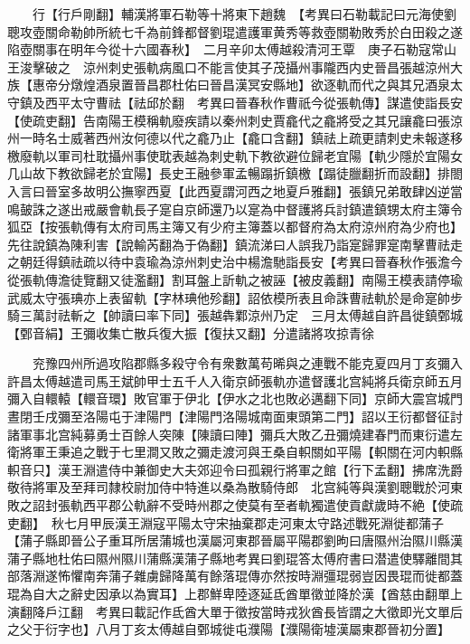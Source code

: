 　　行【行戶剛翻】輔漢將軍石勒等十將東下趙魏　【考異曰石勒載記曰元海使劉聰攻壺關命勒帥所統七千為前鋒都督劉琨遣護軍黄秀等救壺關勒敗秀於白田殺之遂陷壺關事在明年今從十六國春秋】　二月辛卯太傅越殺清河王覃　庚子石勒寇常山王浚擊破之　涼州刺史張軌病風口不能言使其子茂攝州事隴西内史晉昌張越涼州大族【惠帝分燉煌酒泉置晉昌郡杜佑曰晉昌漢冥安縣地】欲逐軌而代之與其兄酒泉太守鎮及西平太守曹祛【祛邱於翻　考異曰晉春秋作曹祇今從張軌傳】謀遣使詣長安【使疏吏翻】告南陽王模稱軌廢疾請以秦州刺史賈龕代之龕將受之其兄讓龕曰張涼州一時名士威著西州汝何德以代之龕乃止【龕口含翻】鎮祛上疏更請刺史未報遂移檄廢軌以軍司杜耽攝州事使耽表越為刺史軌下教欲避位歸老宜陽【軌少隱於宜陽女几山故下教欲歸老於宜陽】長史王融參軍孟暢蹋折鎮檄【蹋徒臘翻折而設翻】排閤入言曰晉室多故明公撫寧西夏【此西夏謂河西之地夏戶雅翻】張鎮兄弟敢肆凶逆當鳴皷誅之遂出戒嚴會軌長子寔自京師還乃以寔為中督護將兵討鎮遣鎮甥太府主簿令狐亞【按張軌傳有太府司馬主簿又有少府主簿蓋以都督府為太府涼州府為少府也】先往說鎮為陳利害【說輸芮翻為于偽翻】鎮流涕曰人誤我乃詣寔歸罪寔南擊曹祛走之朝廷得鎮祛疏以待中袁瑜為涼州刺史治中楊澹馳詣長安【考異曰晉春秋作張澹今從張軌傳澹徒覽翻又徒濫翻】割耳盤上訢軌之被誣【被皮義翻】南陽王模表請停瑜武威太守張琠亦上表留軌【字林琠他殄翻】詔依模所表且命誅曹祛軌於是命寔帥步騎三萬討祛斬之【帥讀曰率下同】張越犇鄴涼州乃定　三月太傅越自許昌徙鎮鄄城【鄄音絹】王彌收集亡散兵復大振【復扶又翻】分遣諸將攻掠青徐

　　兖豫四州所過攻陷郡縣多殺守令有衆數萬苟晞與之連戰不能克夏四月丁亥彌入許昌太傅越遣司馬王斌帥甲士五千人入衛京師張軌亦遣督護北宫純將兵衛京師五月彌入自轘轅【轘音環】敗官軍于伊北【伊水之北也敗必邁翻下同】京師大震宫城門晝閉壬戌彌至洛陽屯于津陽門【津陽門洛陽城南面東頭第二門】詔以王衍都督征討諸軍事北宫純募勇士百餘人突陳【陳讀曰陣】彌兵大敗乙丑彌燒建春門而東衍遣左衛將軍王秉追之戰于七里澗又敗之彌走渡河與王桑自軹關如平陽【軹關在河内軹縣軹音只】漢王淵遣侍中兼御史大夫郊迎令曰孤親行將軍之館【行下孟翻】拂席洗爵敬待將軍及至拜司隸校尉加侍中特進以桑為散騎侍郎　北宫純等與漢劉聰戰於河東敗之詔封張軌西平郡公軌辭不受時州郡之使莫有至者軌獨遣使貢獻歲時不絶【使疏吏翻】　秋七月甲辰漢王淵寇平陽太守宋抽棄郡走河東太守路述戰死淵徙都蒲子【蒲子縣即晉公子重耳所居蒲城也漢屬河東郡晉屬平陽郡劉昫曰唐隰州治隰川縣漢蒲子縣地杜佑曰隰州隰川蒲縣漢蒲子縣地考異曰劉琨答太傅府書曰潜遣使驛離間其部落淵遂怖懼南奔蒲子雜虜歸降萬有餘落琨傳亦然按時淵彊琨弱豈因畏琨而徙都蓋琨為自大之辭史因承以為實耳】上郡鮮卑陸逐延氐酋單徵並降於漢【酋慈由翻單上演翻降戶江翻　考異曰載記作氐酋大單于徵按當時戎狄酋長皆謂之大徵即光文單后之父于衍字也】八月丁亥太傅越自鄄城徙屯濮陽【濮陽衛墟漢屬東郡晉初分置】

